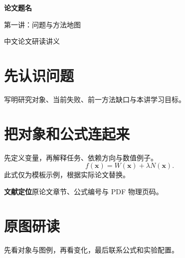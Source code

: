 \documentclass[11pt,a4paper]{article}
\newcommand{\PaperTitle}{论文题名}
\newcommand{\LectureTitle}{第一讲：问题与方法地图}
\newcommand{\SourceNote}[1]{\par{\footnotesize\color{blue}\textbf{文献定位}\quad #1}\par}
\begin{document}
\begin{center}
{\LARGE\bfseries\color{navy}\PaperTitle}\par
{\large\LectureTitle}\par
{\small 中文论文研读讲义}
\end{center}
\section{先认识问题}
写明研究对象、当前失败、前一方法缺口与本讲学习目标。
\section{把对象和公式连起来}
先定义变量，再解释任务、依赖方向与数值例子。
\begin{equation}f(\mathbf x)=W(\mathbf x)+\lambda N(\mathbf x).\end{equation}
此式仅为模板示例，根据实际论文替换。
\SourceNote{原论文章节、公式编号与 PDF 物理页码。}
\section{原图研读}
先看对象与图例，再看变化，最后联系公式和实验配置。
\end{document}
